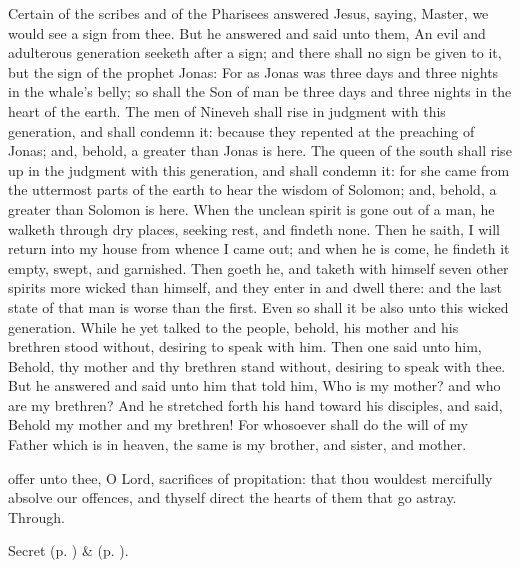 
 Certain of the scribes and of the Pharisees answered Jesus, saying, Master, we would see a sign from thee. But he answered and said unto them, An evil and adulterous generation seeketh after a sign; and there shall no sign be given to it, but the sign of the prophet Jonas: For as Jonas was three days and three nights in the whale's belly; so shall the Son of man be three days and three nights in the heart of the earth. The men of Nineveh shall rise in judgment with this generation, and shall condemn it: because they repented at the preaching of Jonas; and, behold, a greater than Jonas is here. The queen of the south shall rise up in the judgment with this generation, and shall condemn it: for she came from the uttermost parts of the earth to hear the wisdom of Solomon; and, behold, a greater than Solomon is here. When the unclean spirit is gone out of a man, he walketh through dry places, seeking rest, and findeth none. Then he saith, I will return into my house from whence I came out; and when he is come, he findeth it empty, swept, and garnished. Then goeth he, and taketh with himself seven other spirits more wicked than himself, and they enter in and dwell there: and the last state of that man is worse than the first. Even so shall it be also unto this wicked generation. While he yet talked to the people, behold, his mother and his brethren stood without, desiring to speak with him. Then one said unto him, Behold, thy mother and thy brethren stand without, desiring to speak with thee. But he answered and said unto him that told him, Who is my mother? and who are my brethren? And he stretched forth his hand toward his disciples, and said, Behold my mother and my brethren! For whosoever shall do the will of my Father which is in heaven, the same is my brother, and sister, and mother.


\secret
{} offer unto thee, O Lord, sacrifices of propitation: that thou wouldest mercifully absolve our offences, and thyself direct the hearts of them that go astray. Through.
\begin{rubric}
     Secret  (p. \pageref{AshWednesdayMassSecret}) \&   (p. \pageref{SPLivingDeparted}).
\end{rubric}

